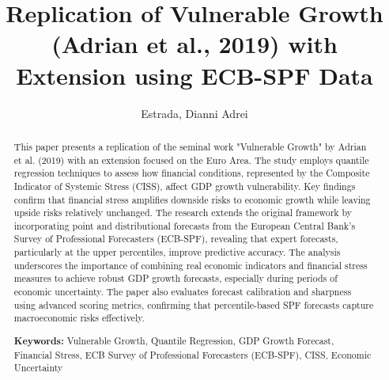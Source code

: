 \documentclass{article}
\author[1]{Estrada, Dianni Adrei}
\affil[1]{M2 Finance, Technology, and Data (FTD), Université Paris 1 - Panthéon Sorbonne}
\title{\textbf{Replication of Vulnerable Growth (Adrian et al., 2019) with Extension using ECB-SPF Data}}
\begin{document}
\maketitle


\begin{abstract}
This paper presents a replication of the seminal work "Vulnerable Growth" by Adrian et al. (2019) with an extension focused on the Euro Area. The study employs quantile regression techniques to assess how financial conditions, represented by the Composite Indicator of Systemic Stress (CISS), affect GDP growth vulnerability. Key findings confirm that financial stress amplifies downside risks to economic growth while leaving upside risks relatively unchanged. The research extends the original framework by incorporating point and distributional forecasts from the European Central Bank’s Survey of Professional Forecasters (ECB-SPF), revealing that expert forecasts, particularly at the upper percentiles, improve predictive accuracy. The analysis underscores the importance of combining real economic indicators and financial stress measures to achieve robust GDP growth forecasts, especially during periods of economic uncertainty. The paper also evaluates forecast calibration and sharpness using advanced scoring metrics, confirming that percentile-based SPF forecasts capture macroeconomic risks effectively.

\medskip
\noindent \textbf{Keywords:} Vulnerable Growth, Quantile Regression, GDP Growth Forecast, Financial Stress, ECB Survey of Professional Forecasters (ECB-SPF), CISS, Economic Uncertainty
\end{abstract}

\linenumbers
\end{document}
